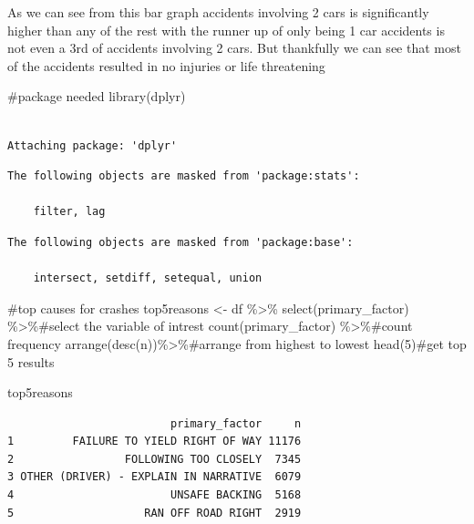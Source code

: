 \documentclass[
  letterpaper,
  DIV=11,
  numbers=noendperiod]{scrartcl}
\newenvironment{Shaded}{\begin{snugshade}}{\end{snugshade}}
\newcommand{\CommentTok}[1]{\textcolor[rgb]{0.37,0.37,0.37}{#1}}
\newcommand{\DecValTok}[1]{\textcolor[rgb]{0.68,0.00,0.00}{#1}}
\newcommand{\FunctionTok}[1]{\textcolor[rgb]{0.28,0.35,0.67}{#1}}
\newcommand{\NormalTok}[1]{\textcolor[rgb]{0.00,0.23,0.31}{#1}}
\newcommand{\OtherTok}[1]{\textcolor[rgb]{0.00,0.23,0.31}{#1}}
\newcommand{\SpecialCharTok}[1]{\textcolor[rgb]{0.37,0.37,0.37}{#1}}
\begin{document}
As we can see from this bar graph accidents involving 2 cars is
significantly higher than any of the rest with the runner up of only
being 1 car accidents is not even a 3rd of accidents involving 2 cars.
But thankfully we can see that most of the accidents resulted in no
injuries or life threatening

\begin{Shaded}
\begin{Highlighting}[]
\CommentTok{\#package needed}
\FunctionTok{library}\NormalTok{(dplyr)}
\end{Highlighting}
\end{Shaded}

\begin{verbatim}

Attaching package: 'dplyr'
\end{verbatim}

\begin{verbatim}
The following objects are masked from 'package:stats':

    filter, lag
\end{verbatim}

\begin{verbatim}
The following objects are masked from 'package:base':

    intersect, setdiff, setequal, union
\end{verbatim}

\begin{Shaded}
\begin{Highlighting}[]
\CommentTok{\#top causes for crashes}
\NormalTok{top5reasons }\OtherTok{\textless{}{-}}\NormalTok{ df }\SpecialCharTok{\%\textgreater{}\%}
  \FunctionTok{select}\NormalTok{(primary\_factor) }\SpecialCharTok{\%\textgreater{}\%}\CommentTok{\#select the variable of intrest}
  \FunctionTok{count}\NormalTok{(primary\_factor) }\SpecialCharTok{\%\textgreater{}\%}\CommentTok{\#count frequency }
  \FunctionTok{arrange}\NormalTok{(}\FunctionTok{desc}\NormalTok{(n))}\SpecialCharTok{\%\textgreater{}\%}\CommentTok{\#arrange from highest to lowest}
  \FunctionTok{head}\NormalTok{(}\DecValTok{5}\NormalTok{)}\CommentTok{\#get top 5 results}

\NormalTok{top5reasons}
\end{Highlighting}
\end{Shaded}

\begin{verbatim}
                         primary_factor     n
1         FAILURE TO YIELD RIGHT OF WAY 11176
2                 FOLLOWING TOO CLOSELY  7345
3 OTHER (DRIVER) - EXPLAIN IN NARRATIVE  6079
4                        UNSAFE BACKING  5168
5                    RAN OFF ROAD RIGHT  2919
\end{verbatim}
\end{document}
